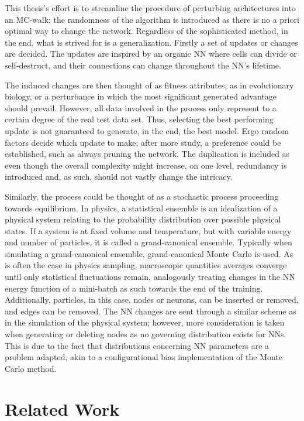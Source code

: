 This thesis's effort is to streamline the procedure of perturbing architectures into an MC-walk; the randomness of the algorithm is introduced as there is no a priori optimal way to change the network. Regardless of the sophisticated method, in the end, what is strived for is a generalization. Firstly a set of updates or changes are decided. The updates are inspired by an organic NN where cells can divide or self-destruct, and their connections can change throughout the NN's lifetime. 

The induced changes are then thought of as fitness attributes, as in evolutionary biology, or a perturbance in which the most significant generated advantage should prevail. However, all data involved in the process only represent to a certain degree of the real test data set. Thus, selecting the best performing update is not guaranteed to generate, in the end, the best model. Ergo random factors decide which update to make; after more study, a preference could be established, such as always pruning the network. The duplication is included as even though the overall complexity might increase, on one level, redundancy is introduced and, as such, should not vastly change the intricacy. 

Similarly, the process could be thought of as a stochastic process proceeding towards equilibrium. In physics, a statistical ensemble is an idealization of a physical system relating to the probability distribution over possible physical states. If a system is at fixed volume and temperature, but with variable energy and number of particles, it is called a grand-canonical ensemble. Typically when simulating a grand-canonical ensemble, grand-canonical Monte Carlo is used. As is often the case in physics sampling, macroscopic quantities averages converge until only statistical fluctuations remain, analogously treating changes in the NN energy function of a mini-batch as such towards the end of the training. Additionally, particles, in this case, nodes or neurons, can be inserted or removed, and edges can be removed. The NN changes are sent through a similar scheme as in the simulation of the physical system; however, more consideration is taken when generating or deleting nodes as no governing distribution exists for NNs. This is due to the fact that distributions concerning NN parameters are a problem adapted, akin to a configurational bias implementation of the Monte Carlo method. 

\section{Related Work}


